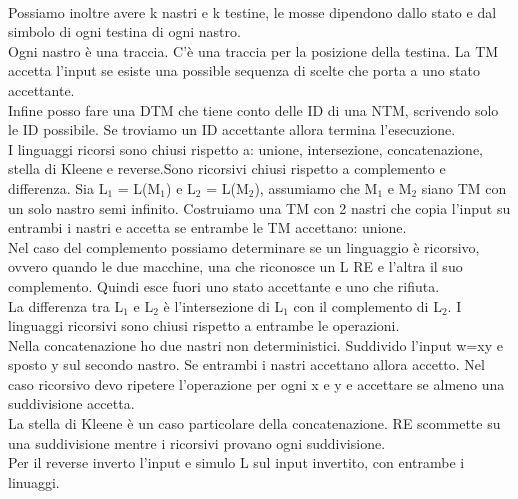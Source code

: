 \documentclass[12pt]{article}
\begin{document}
\\ Possiamo inoltre avere k nastri e k testine, le mosse dipendono dallo stato e dal simbolo di ogni testina di ogni nastro.
\\ Ogni nastro è una traccia. C'è una traccia per la posizione della testina. La TM accetta l'input se esiste una possible sequenza di scelte che porta a uno stato accettante.
\\ Infine posso fare una DTM che tiene conto delle ID di una NTM, scrivendo solo le ID possibile. Se troviamo un ID accettante allora termina l'esecuzione.
\vspace{5mm}
\\ I linguaggi ricorsi sono chiusi rispetto a: unione, intersezione, concatenazione, stella di Kleene e reverse.Sono ricorsivi chiusi rispetto a complemento e differenza.
\vspace{5mm} 
Sia L$_1$ = L(M$_1$) e L$_2$ = L(M$_2$), assumiamo che M$_1$ e M$_2$ siano TM con un solo nastro semi infinito.
Costruiamo una TM con 2 nastri che copia l'input su entrambi i nastri e accetta se entrambe le TM accettano: unione.
\\ Nel caso del complemento possiamo determinare se un linguaggio è ricorsivo, ovvero quando le due macchine, una che riconosce un L RE e l'altra il suo complemento. Quindi esce fuori uno stato accettante e uno che rifiuta.
\\ La differenza tra L$_1$ e L$_2$ è l'intersezione di L$_1$ con il complemento di L$_2$. I linguaggi ricorsivi sono chiusi rispetto a entrambe le operazioni.
\\ Nella concatenazione ho due nastri non deterministici. Suddivido l'input w=xy e sposto y sul secondo nastro. 
Se entrambi i nastri accettano allora accetto. Nel caso ricorsivo devo ripetere l'operazione per ogni x e y e accettare se almeno una suddivisione accetta.
\\ La stella di Kleene è un caso particolare della concatenazione. RE scommette su una suddivisione mentre i ricorsivi provano ogni suddivisione.
\\ Per il reverse inverto l'input e simulo L sul input invertito, con entrambe i linuaggi. 
\end{document}
